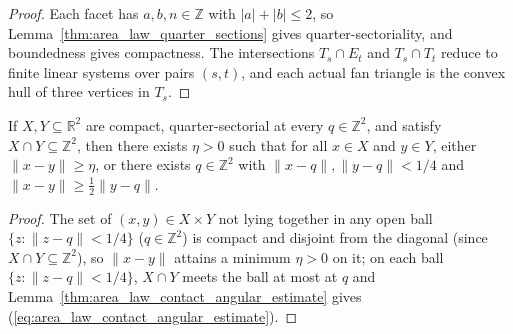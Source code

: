 \begin{proof}
    \leanok
    Each facet has $a,b,n\in\mathbb Z$ with $|a|+|b|\le2$, so Lemma~\ref{thm:area_law_quarter_sections}
    gives quarter-sectoriality, and boundedness gives compactness. The intersections $T_s\cap E_t$
    and $T_s\cap T_t$ reduce to finite linear systems over pairs $(s,t)$, and each actual fan triangle
    is the convex hull of three vertices in $T_s$.
\end{proof}

\begin{lemma}
    \label{thm:area_law_contact_dichotomy}
    \leanok
    If $X,Y\subseteq\mathbb R^2$ are compact, quarter-sectorial at every $q\in\mathbb Z^2$,
    and satisfy $X\cap Y\subseteq\mathbb Z^2$, then there exists $\eta>0$ such that for all
    $x\in X$ and $y\in Y$, either $\|x-y\|\ge\eta$, or there exists $q\in\mathbb Z^2$ with
    $\|x-q\|,\|y-q\|<1/4$ and $\|x-y\|\ge\frac12\|y-q\|$.
\end{lemma}

\begin{proof}
    \leanok
    The set of $(x,y)\in X\times Y$ not lying together in any open ball $\{z:\|z-q\|<1/4\}$
    ($q\in\mathbb Z^2$) is compact and disjoint from the diagonal (since $X\cap Y\subseteq\mathbb Z^2$),
    so $\|x-y\|$ attains a minimum $\eta>0$ on it; on each ball $\{z:\|z-q\|<1/4\}$,
    $X\cap Y$ meets the ball at most at $q$ and Lemma~\ref{thm:area_law_contact_angular_estimate}
    gives (\ref{eq:area_law_contact_angular_estimate}).
\end{proof}

